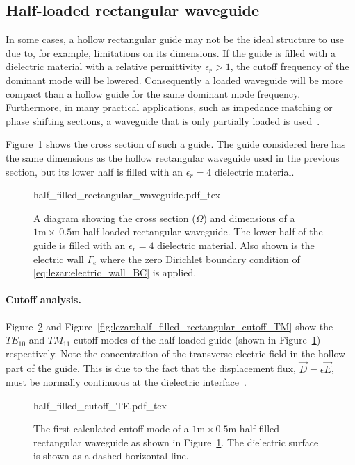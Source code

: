 \subsection{Half-loaded rectangular waveguide}

In some cases, a hollow rectangular guide may not be the ideal structure
to use due to, for example, limitations on its dimensions. If the guide
is filled with a dielectric material with a relative permittivity
$\epsilon_r > 1$, the cutoff frequency of the dominant mode will be
lowered. Consequently a loaded waveguide will be more compact than
a hollow guide for the same dominant mode frequency. Furthermore,
in many practical applications, such as impedance matching or phase
shifting sections, a waveguide that is only partially loaded is
used~\citep{Pozar2005}.

Figure~\ref{fig:lezar:half_filled_rectangular_guide} shows the cross
section of such a guide. The guide considered here has the same dimensions
as the hollow rectangular waveguide used in the previous section, but
its lower half is filled with an $\epsilon_r = 4$ dielectric material.
\begin{figure}
    \centering
    \def\svgwidth{\smallfig}
    {half_filled_rectangular_waveguide.pdf_tex}
    \caption{A diagram showing the cross section ($\Omega$)
    and dimensions of a $1\text{m}\times~0.5\text{m}$ half-loaded
    rectangular waveguide. The lower half of the guide is filled with
    an $\epsilon_r = 4$ dielectric material. Also shown is the electric
    wall $\Gamma_e$ where the zero Dirichlet boundary condition of
    \eqref{eq:lezar:electric_wall_BC} is applied.}
    \label{fig:lezar:half_filled_rectangular_guide}
\end{figure}

\paragraph{Cutoff analysis.}

Figure~\ref{fig:lezar:half_filled_rectangular_cutoff_TE} and
Figure~\ref{fig:lezar:half_filled_rectangular_cutoff_TM} show the
$TE_{10}$ and $TM_{11}$ cutoff modes of the half-loaded guide (shown in
Figure~\ref{fig:lezar:half_filled_rectangular_guide}) respectively. Note
the concentration of the transverse electric field in the hollow part of
the guide. This is due to the fact that the displacement flux, $\vec{D}
= \epsilon\vec{E}$, must be normally continuous at the dielectric
interface~\citep{Pozar2005, Smith1997}.
\begin{figure}
\centering
  \def\svgwidth{\smallfig}
    {half_filled_cutoff_TE.pdf_tex}
\caption{The first calculated cutoff mode of a
$1\text{m}\times0.5\text{m}$ half-filled rectangular waveguide as shown
in Figure~\ref{fig:lezar:half_filled_rectangular_guide}. The dielectric
surface is shown as a dashed horizontal line.}
\label{fig:lezar:half_filled_rectangular_cutoff_TE}
\end{figure}

